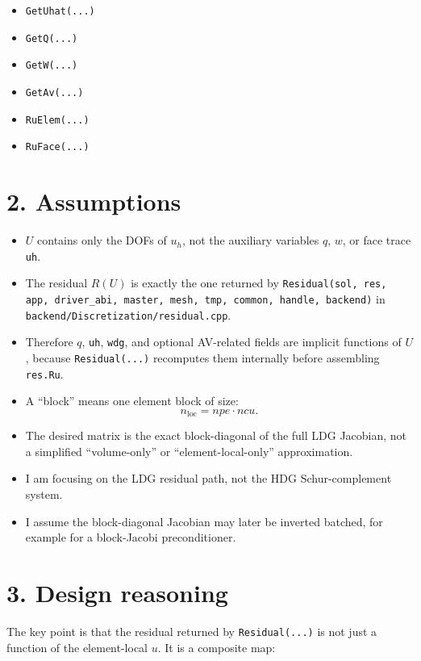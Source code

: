 \documentclass[11pt]{article}
\begin{document}
\begin{itemize}[leftmargin=*]
\item \texttt{GetUhat(...)}
\item \texttt{GetQ(...)}
\item \texttt{GetW(...)}
\item \texttt{GetAv(...)}
\item \texttt{RuElem(...)}
\item \texttt{RuFace(...)}
\end{itemize}

\section*{2. Assumptions}

\begin{itemize}[leftmargin=*]
\item $U$ contains only the DOFs of $u_h$, not the auxiliary variables $q$,
$w$, or face trace \texttt{uh}.
\item The residual $R(U)$ is exactly the one returned by
\texttt{Residual(sol, res, app, driver\_abi, master, mesh, tmp, common, handle, backend)}
in \texttt{backend/Discretization/residual.cpp}.
\item Therefore $q$, \texttt{uh}, \texttt{wdg}, and optional AV-related fields
are implicit functions of $U$, because \texttt{Residual(...)} recomputes them
internally before assembling \texttt{res.Ru}.
\item A ``block'' means one element block of size:
\[
n_{\mathrm{loc}} = npe \cdot ncu.
\]
\item The desired matrix is the exact block-diagonal of the full LDG Jacobian,
not a simplified ``volume-only'' or ``element-local-only'' approximation.
\item I am focusing on the LDG residual path, not the HDG Schur-complement
system.
\item I assume the block-diagonal Jacobian may later be inverted batched, for
example for a block-Jacobi preconditioner.
\end{itemize}

\section*{3. Design reasoning}

The key point is that the residual returned by \texttt{Residual(...)} is not
just a function of the element-local $u$. It is a composite map:
\end{document}
